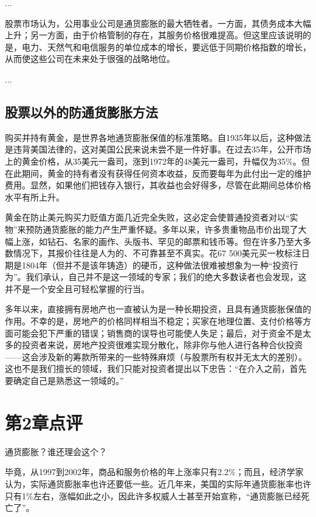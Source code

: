 \documentclass[12pt,oneside]{book}
\begin{document}
...

股票市场认为，公用事业公司是通货膨胀的最大牺牲者。一方面，其债务成本大幅上升；另一方面，由于价格管制的存在，其服务价格很难提高。但这里应该说明的是，电力、天然气和电信服务的单位成本的增长，要远低于同期价格指数的增长，从而使这些公司在未来处于很强的战略地位。

...

\subsection{股票以外的防通货膨胀方法}
购买并持有黄金，是世界各地通货膨胀保值的标准策略。自1935年以后，这种做法是违背美国法律的，这对美国公民来说未尝不是一件好事。在过去35年，公开市场上的黄金价格，从35美元一盎司，涨到1972年的48美元一盎司，升幅仅为35\%。但在此期间，黄金的持有者没有获得任何资本收益，反而要每年为此付出一定的维护费用。显然，如果他们把钱存入银行，其收益也会好得多，尽管在此期间总体价格水平有所上升。

黄金在防止美元购买力贬值方面几近完全失败，这必定会使普通投资者对以“实物”来预防通货膨胀的能力产生严重怀疑。多年以来，许多贵重物品市价出现了大幅上涨，如钻石、名家的画作、头版书、罕见的邮票和钱币等。但在许多乃至大多数情况下，其报价往往是人为的、不可靠甚至不真实。花67 500美元买一枚标注日期是1804年（但并不是该年铸造）的硬币，这种做法很难被想象为一种“投资行为”。我们承认，自己并不是这一领域的专家；我们的绝大多数读者也会发现，这并不是一个安全且可轻松掌握的行当。

多年以来，直接拥有房地产也一直被认为是一种长期投资，且具有通货膨胀保值的作用。不幸的是，房地产的价格同样相当不稳定；买家在地理位置、支付价格等方面可能会犯下严重的错误；销售商的误导也可能使人失足；最后，对于资金不是太多的投资者来说，房地产投资很难实现分散化，除非你与他人进行各种合伙投资——这会涉及新的筹款所带来的一些特殊麻烦（与股票所有权并无太大的差别）。这也不是我们擅长的领域，我们只能对投资者提出以下忠告：“在介入之前，首先要确定自己是熟悉这一领域的。”


\section{第2章点评}
通货膨胀？谁还理会这个？

毕竟，从1997到2002年，商品和服务价格的年上涨率只有2.2\%；而且，经济学家认为，实际通货膨胀率也许还要低一些。近几年来，美国的实际年通货膨胀率也许只有1\%左右，涨幅如此之小，因此许多权威人士甚至开始宣称，“通货膨胀已经死亡了”。
\end{document}

